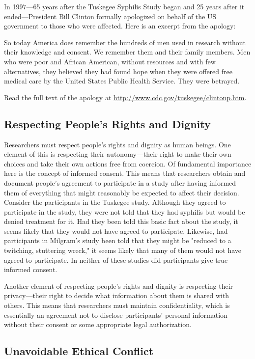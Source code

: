In 1997---65 years after the Tuskegee Syphilis Study began and 25 years after it ended---President Bill Clinton formally apologized on behalf of the US government to those who were affected. Here is an excerpt from the apology:

So today America does remember the hundreds of men used in research without their knowledge and consent. We remember them and their family members. Men who were poor and African American, without resources and with few alternatives, they believed they had found hope when they were offered free medical care by the United States Public Health Service. They were betrayed.

Read the full text of the apology at \url{http://www.cdc.gov/tuskegee/clintonp.htm}.

\subsection{Respecting People's Rights and Dignity}

Researchers must respect people's rights and dignity as human beings. One element of this is respecting their autonomy---their right to make their own choices and take their own actions free from coercion. Of fundamental importance here is the concept of informed consent. This means that researchers obtain and document people's agreement to participate in a study after having informed them of everything that might reasonably be expected to affect their decision. Consider the participants in the Tuskegee study. Although they agreed to participate in the study, they were not told that they had syphilis but would be denied treatment for it. Had they been told this basic fact about the study, it seems likely that they would not have agreed to participate. Likewise, had participants in Milgram's study been told that they might be "reduced to a twitching, stuttering wreck," it seems likely that many of them would not have agreed to participate. In neither of these studies did participants give true informed consent.

Another element of respecting people's rights and dignity is respecting their privacy---their right to decide what information about them is shared with others. This means that researchers must maintain confidentiality, which is essentially an agreement not to disclose participants' personal information without their consent or some appropriate legal authorization.

\subsection{Unavoidable Ethical Conflict}

